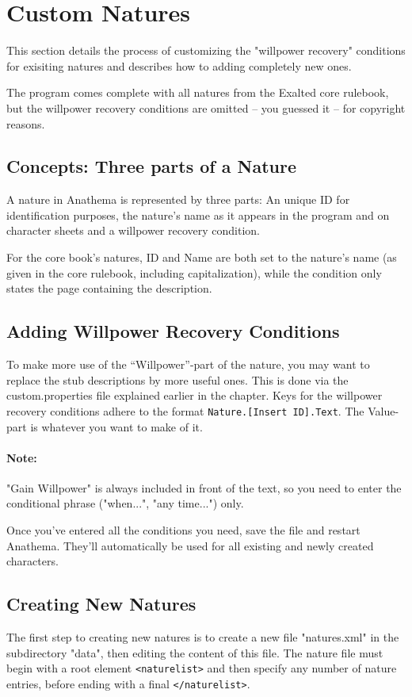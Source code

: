 \section{Custom Natures}
This section details the process of customizing the "willpower recovery" conditions for 
exisiting natures and describes how to adding completely new ones. 

The program comes complete with all natures from the Exalted core rulebook, but the willpower recovery conditions are omitted -- you guessed it -- for copyright reasons. 

\subsection{Concepts: Three parts of a Nature}
A nature in Anathema is represented by three parts: An unique ID for identification purposes,
the nature's name as it appears in the program and on character sheets and a
willpower recovery condition. 

For the core book's natures, ID and Name are both set to the nature's name (as given in the core rulebook, including capitalization), while the condition only states the page containing the description.

\subsection{Adding Willpower Recovery Conditions}
To make more use of the "`Willpower"'-part of the nature, you may want to replace the stub descriptions by more useful ones. This is done via the custom.properties file explained earlier in the chapter. Keys for the willpower recovery conditions adhere to the format \texttt{Nature.[Insert ID].Text}. The Value-part is whatever you want to make of it.

\paragraph{Note:} "Gain Willpower" is always included in front of the text, so you need to enter the conditional
phrase ("when...", "any time...") only.

Once you've entered all the conditions you need, save the file and restart Anathema. They'll automatically be used for all existing and newly created characters.

\subsection{Creating New Natures}
The first step to creating new natures is to create a new file "natures.xml" in the subdirectory "data", then editing the content of this file. The nature file must begin with a root element \texttt{<naturelist>} and then specify any number of
nature entries, before ending with a final \texttt{</naturelist>}.

